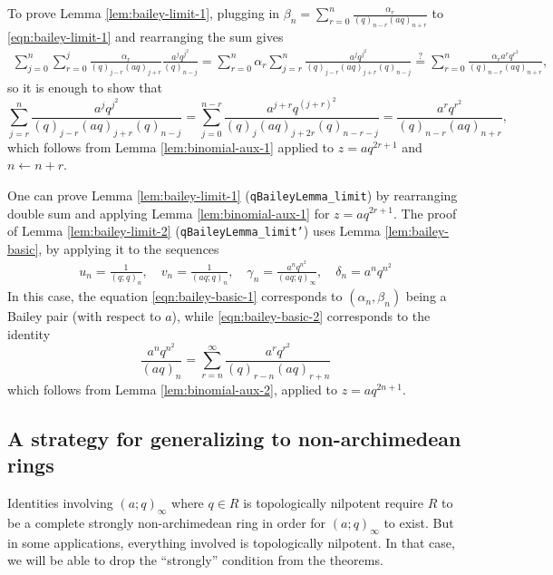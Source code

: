 \documentclass[12pt]{amsart}
\theoremstyle{definition}
\theoremstyle{remark}
\numberwithin{equation}{subsection}
\begin{document}
To prove Lemma \ref{lem:bailey-limit-1}, plugging in $\beta_n = \sum_{r=0}^{n} \frac{\alpha_r}{(q)_{n-r} (aq)_{n+r}}$ to \eqref{eqn:bailey-limit-1} and rearranging the sum gives
\begin{align*}
    \sum_{j=0}^{n} \sum_{r=0}^{j} \frac{\alpha_r}{(q)_{j-r} (aq)_{j+r}} \frac{a^j q^{j^2}}{(q)_{n-j}}  = \sum_{r=0}^{n} \alpha_r \sum_{j=r}^{n} \frac{a^j q^{j^2}}{(q)_{j-r} (aq)_{j+r} (q)_{n-j}} \stackrel{?}{=} \sum_{r=0}^{n} \frac{\alpha_r a^r q^{r^2}}{(q)_{n-r}(aq)_{n+r}},
\end{align*}
so it is enough to show that
\begin{equation}
    \sum_{j=r}^{n} \frac{a^j q^{j^2}}{(q)_{j-r}(aq)_{j+r}(q)_{n-j}} = \sum_{j=0}^{n-r} \frac{a^{j+r} q^{(j+r)^2}}{(q)_j (aq)_{j+2r}(q)_{n-r-j}} = \frac{a^r q^{r^2}}{(q)_{n-r}(aq)_{n+r}},
\end{equation}
which follows from Lemma \ref{lem:binomial-aux-1} applied to $z = aq^{2r+1}$ and $n \leftarrow n + r$.

One can prove Lemma \ref{lem:bailey-limit-1} (\texttt{qBaileyLemma\_limit}) by rearranging double sum and applying Lemma \ref{lem:binomial-aux-1} for $z = aq^{2r + 1}$.
The proof of Lemma \ref{lem:bailey-limit-2} (\texttt{qBaileyLemma\_limit'}) uses Lemma \ref{lem:bailey-basic}, by applying it to the sequences
\begin{align*}
    u_n = \frac{1}{(q;q)_n}, \quad
    v_n = \frac{1}{(aq;q)_n}, \quad
    \gamma_n = \frac{a^n q^{n^2}}{(aq;q)_{\infty}}, \quad
    \delta_n = a^n q^{n^2}
\end{align*}
In this case, the equation \eqref{eqn:bailey-basic-1} corresponds to $(\alpha_n, \beta_n)$ being a Bailey pair (with respect to $a$), while \eqref{eqn:bailey-basic-2} corresponds to the identity
\begin{equation}
    \label{eqn:bailey_aux}
    \frac{a^n q^{n^2}}{(aq)_n} = \sum_{r=n}^{\infty} \frac{a^r q^{r^2}}{(q)_{r-n} (aq)_{r+n}}
\end{equation}
which follows from Lemma \ref{lem:binomial-aux-2}, applied to $z = aq^{2n+1}$.

\subsection{A strategy for generalizing to non-archimedean rings}

Identities involving $(a; q)_\infty$ where $q \in R$ is topologically nilpotent require $R$ to be a complete strongly non-archimedean ring in order for $(a; q)_\infty$ to exist. But in some applications, everything involved is topologically nilpotent. In that case, we will be able to drop the ``strongly'' condition from the theorems.
\end{document}
